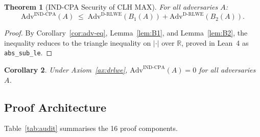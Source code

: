 \documentclass[11pt,a4paper]{article}
\newtheorem{theorem}{Theorem}[section]
\newtheorem{corollary}[theorem]{Corollary}
\theoremstyle{remark}
\begin{document}
\begin{theorem}[IND-CPA Security of CLH MAX]\label{thm:indcpa}
For all adversaries $A$:
\[
\mathrm{Adv}^{\mathrm{IND\text{-}CPA}}(A)
  \;\le\;
\mathrm{Adv}^{\mathrm{D\text{-}RLWE}}(B_{1}(A))
  +\mathrm{Adv}^{\mathrm{D\text{-}RLWE}}(B_{2}(A)).
\]
\end{theorem}

\begin{proof}
By Corollary~\ref{cor:adv-eq}, Lemma~\ref{lem:B1}, and Lemma~\ref{lem:B2},
the inequality reduces to the triangle inequality on $|\cdot|$ over $\mathbb{R}$,
proved in Lean~4 as \texttt{abs\_sub\_le}.
\end{proof}

\begin{corollary}
Under Axiom~\ref{ax:drlwe}, $\mathrm{Adv}^{\mathrm{IND\text{-}CPA}}(A)=0$
for all adversaries $A$.
\end{corollary}

\subsection{Proof Architecture}

Table~\ref{tab:audit} summarises the 16 proof components.
\end{document}
